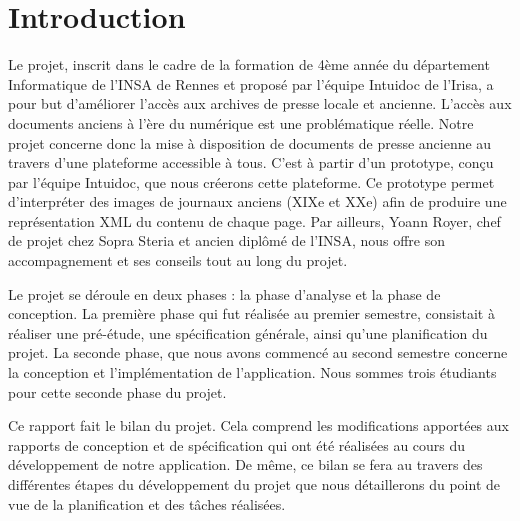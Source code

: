 \section{Introduction}
\label{sec:intro}

Le projet, inscrit dans le cadre de la formation de 4ème année du département Informatique de l’INSA de Rennes et proposé par l’équipe Intuidoc de l’Irisa, a pour but d’améliorer l’accès aux archives de presse locale et ancienne. L’accès aux documents anciens à l’ère du numérique est une problématique réelle. Notre projet concerne donc la mise à disposition de documents de presse ancienne au travers d’une plateforme accessible à tous. C’est à partir d’un prototype, conçu par l’équipe Intuidoc, que nous créerons cette plateforme.
Ce prototype permet d’interpréter des images de journaux anciens (XIXe et XXe) afin de produire une représentation XML du contenu de chaque page. Par ailleurs, Yoann Royer, chef de projet chez Sopra Steria et ancien diplômé de l’INSA, nous offre son accompagnement et ses conseils tout au long du projet.

Le projet se déroule en deux phases : la phase d'analyse et la phase de conception. La première phase qui fut réalisée au premier semestre, consistait à réaliser une pré-étude, une spécification générale, ainsi qu'une planification  du projet. La seconde phase, que nous avons commencé au second semestre concerne la conception et l'implémentation de l'application. Nous sommes trois étudiants pour cette seconde phase du projet.

Ce rapport fait le bilan du projet. Cela comprend les modifications apportées aux rapports de conception\cite{Conc} et de spécification\cite{Specs} qui ont été réalisées au cours du développement de notre application. De même, ce bilan se fera au travers des différentes étapes du développement du projet que nous détaillerons du point de vue de la planification et des tâches réalisées.

